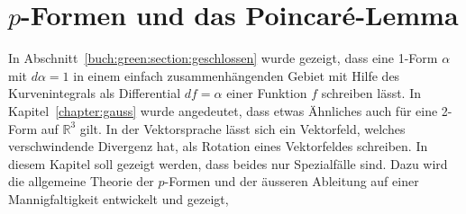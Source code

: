 %
%
%
\chapter{$p$-Formen und das Poincaré-Lemma
\label{chapter:pformen}}
In Abschnitt~\ref{buch:green:section:geschlossen} wurde gezeigt, dass eine
1-Form $\alpha$ mit $d\alpha=1$ in einem einfach zusammenhängenden Gebiet
mit Hilfe des Kurvenintegrals als Differential $df=\alpha$ einer Funktion
$f$ schreiben lässt.
In Kapitel~\ref{chapter:gauss} wurde angedeutet, dass etwas Ähnliches auch
für eine 2-Form auf $\mathbb{R}^3$ gilt.
In der Vektorsprache lässt sich ein Vektorfeld, welches verschwindende
Divergenz hat, als Rotation eines Vektorfeldes schreiben.
In diesem Kapitel soll gezeigt werden, dass beides nur Spezialfälle sind.
Dazu wird die allgemeine Theorie der $p$-Formen und der äusseren Ableitung
auf einer Mannigfaltigkeit entwickelt und gezeigt, 






